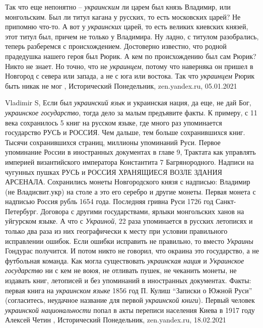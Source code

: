 Так что еще непонятно – \emph{украинским} ли царем был князь Владимир, или
монгольским. Был ли титул кагана у русских, то есть московских царей? Не
припомню что-то. А вот у \emph{украинских} царей, то есть великих киевских князей,
этот титул был, причем не только у Владимира.  Ну ладно, с титулом разобрались,
теперь разберемся с происхождением. Достоверно известно, что родной прадедушка
нашего героя был Рюрик. А кем по происхождению был сам Рюрик? Никто не знает.
Но точно, что не \emph{украинцем}, потому что наверняка он пришел в Новгород с севера
или запада, а не с юга или востока. Так что \emph{украинцем} Рюрик быть никак не мог
,
Исторический Понедельник, zen.yandex.ru, 05.01.2021 

Vladimir S, Если был \emph{украинский язык} и украинская нация, да еще, не дай
Бог, \emph{украинское государство}, тогда дело за малым предъявите факты.  К
примеру, с 11 века сохранилось 5 книг на русском языке, где много раз
упоминается государство РУСЬ и РОССИЯ. Чем дальше, тем больше сохранившихся
книг. Тысячи сохранившихся страниц, миллионы упоминаний Руси. Первое упоминание
России в иностранных документах в главе 9, Трактата как управлять империей
византийского императора Константита 7 Багрянородного. Надписи на чугунных
пушках РУСЬ и РОССИЯ ХРАНЯЩИЕСЯ ВОЗЛЕ ЗДАНИЯ АРСЕНАЛА. Сохранились монеты
Новгородского князя с надписью: Владимир (не Владисвит.укр) на столе а это его
серебро и другие монеты. Первая монета с надписью Россия рубль 1654 года.
Последняя гривна Руси 1726 год Санкт-Петербург. Договора с другими
государствами, ярлыки монгольских ханов на уйгурском языке.  А что с
\emph{Украиной}, 22 раза упоминается в русских летописях и только два раза из
них географически к месту при условии правильного исправлении ошибок. Если
ошибки исправить не правильно, то вместо \emph{Украины} Гондурас получится. И
потом никто не говорил, что окраина это государство, а не футбольная команда.
Как могла существовать \emph{украинская нация} и \emph{Украинское государство}
ни с кем не воюя, не отливать пушек, не чеканить монеты, не издавать книг,
летописей и без упоминаний в иностранных документах.  Факты: первая книга на
\emph{украинском языке} 1856 год П. Кулиш \enquote{Записки о Южной Руси}
(согласитесь, неудачное название для первой \emph{украинской книги}). Первый
человек \emph{украинской национальности} попал в акты переписи населения Киева
в 1917 году
Алексей Четин
, 
Исторический Понедельник, zen.yandex.ru, 18.02.2021

